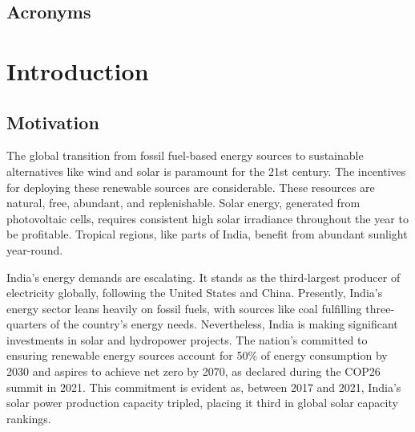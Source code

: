 \documentclass[a4paper,12pt]{Classes/RoboticsLaTeX}
\begin{document}
	
	\tableofcontents
	\listoffigures
	\listoftables

	\section*{Acronyms}
	\begin{acronym}
	\end{acronym}



	\printglossary[title=List of Acronyms,type=\acronymtype]

	
	
	\mainmatter
	
	
	\chapter{Introduction}
	\label{chap:introduction}

	\section{Motivation}
	

	The global transition from fossil fuel-based energy sources to sustainable alternatives like wind and solar is paramount for the 21st century. 
	The incentives for deploying these renewable sources are considerable. These resources are natural, free, abundant, and replenishable. Solar energy, 
	generated from photovoltaic cells, requires consistent high solar irradiance throughout the year to be profitable. Tropical regions, like parts of India, 
	benefit from abundant sunlight year-round.

	India's energy demands are escalating. It stands as the third-largest producer of electricity globally, following the United States and China\cite{bp2021}. 
	Presently, India's energy sector leans heavily on fossil fuels, with sources like coal fulfilling three-quarters of the country's energy needs. Nevertheless, 
	India is making significant investments in solar and hydropower projects. The nation's committed to ensuring renewable energy sources account for 
	50\% of energy consumption by 2030 and aspires to achieve net zero by 2070, as declared during the COP26 summit in 2021\cite{bbc2023}. This commitment 
	is evident as, between 2017 and 2021, India's solar power production capacity tripled, placing it third in global solar capacity rankings\cite{reuters2022}.
\end{document}
